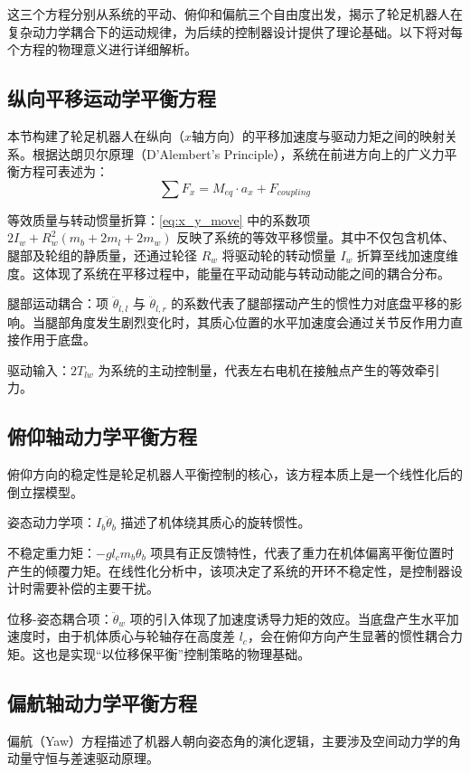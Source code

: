 这三个方程分别从系统的平动、俯仰和偏航三个自由度出发，揭示了轮足机器人在复杂动力学耦合下的运动规律，为后续的控制器设计提供了理论基础。以下将对每个方程的物理意义进行详细解析。

\subsection{纵向平移运动学平衡方程}

本节构建了轮足机器人在纵向（$x$轴方向）的平移加速度与驱动力矩之间的映射关系。根据达朗贝尔原理（D'Alembert's Principle），系统在前进方向上的广义力平衡方程可表述为：$$\sum F_x = M_{eq} \cdot a_x + F_{coupling}$$

等效质量与转动惯量折算：\eqref{eq:x_y_move} 中的系数项 $2I_w + R_{w}^{2}(m_b + 2m_l + 2m_w)$ 反映了系统的等效平移惯量。其中不仅包含机体、腿部及轮组的静质量，还通过轮径 $R_w$ 将驱动轮的转动惯量 $I_w$ 折算至线加速度维度。这体现了系统在平移过程中，能量在平动动能与转动动能之间的耦合分布。

腿部运动耦合：项 $\ddot{\theta}_{l,l}$ 与 $\ddot{\theta}_{l,r}$ 的系数代表了腿部摆动产生的惯性力对底盘平移的影响。当腿部角度发生剧烈变化时，其质心位置的水平加速度会通过关节反作用力直接作用于底盘。

驱动输入：$2T_{lw}$ 为系统的主动控制量，代表左右电机在接触点产生的等效牵引力。

\subsection{俯仰轴动力学平衡方程}

俯仰方向的稳定性是轮足机器人平衡控制的核心，该方程本质上是一个线性化后的倒立摆模型。

姿态动力学项：$I_b \ddot{\theta}_b$ 描述了机体绕其质心的旋转惯性。

不稳定重力矩：$-g l_c m_b \theta_b$ 项具有正反馈特性，代表了重力在机体偏离平衡位置时产生的倾覆力矩。在线性化分析中，该项决定了系统的开环不稳定性，是控制器设计时需要补偿的主要干扰。

位移-姿态耦合项：$\ddot{\theta}_{w}$ 项的引入体现了加速度诱导力矩的效应。当底盘产生水平加速度时，由于机体质心与轮轴存在高度差 $l_c$，会在俯仰方向产生显著的惯性耦合力矩。这也是实现“以位移保平衡”控制策略的物理基础。

\subsection{偏航轴动力学平衡方程}

偏航（Yaw）方程描述了机器人朝向姿态角的演化逻辑，主要涉及空间动力学的角动量守恒与差速驱动原理。

